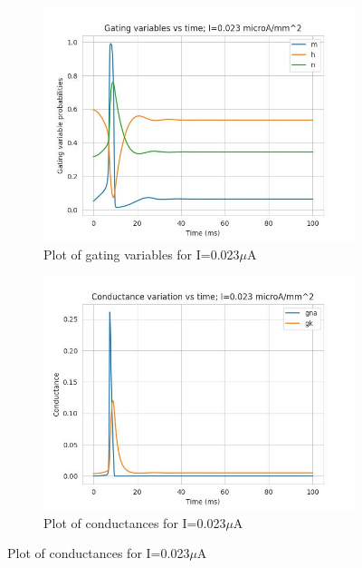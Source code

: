 \documentclass{article}
\begin{document}
\begin{figure}[h]
    \begin{subfigure}[b]{0.45\textwidth}
        \includegraphics[width=1.5\textwidth]{5.jpg}
        \caption{Plot of gating variables for I=0.023$\mu$A}
        \label{fig:IO2}
    \end{subfigure}
    \begin{subfigure}[b]{0.45\textwidth}
        \includegraphics[width=1.5\textwidth]{6.jpg}
        \caption{Plot of conductances for I=0.023$\mu$A}
        \label{fig:IO2}
    \end{subfigure}
\end{figure}
\newpage
\end{document}
